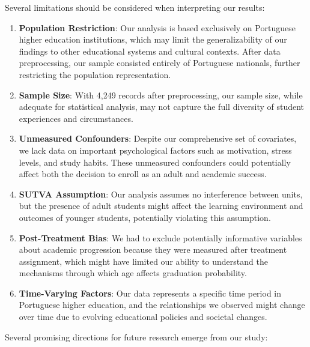 \documentclass{article}
\begin{document}
Several limitations should be considered when interpreting our results:

\begin{enumerate}
    \item \textbf{Population Restriction}: Our analysis is based exclusively on Portuguese higher education institutions, which may limit the generalizability of our findings to other educational systems and cultural contexts. After data preprocessing, our sample consisted entirely of Portuguese nationals, further restricting the population representation.

    \item \textbf{Sample Size}: With 4,249 records after preprocessing, our sample size, while adequate for statistical analysis, may not capture the full diversity of student experiences and circumstances.

    \item \textbf{Unmeasured Confounders}: Despite our comprehensive set of covariates, we lack data on important psychological factors such as motivation, stress levels, and study habits. These unmeasured confounders could potentially affect both the decision to enroll as an adult and academic success.

    \item \textbf{SUTVA Assumption}: Our analysis assumes no interference between units, but the presence of adult students might affect the learning environment and outcomes of younger students, potentially violating this assumption.

    \item \textbf{Post-Treatment Bias}: We had to exclude potentially informative variables about academic progression because they were measured after treatment assignment, which might have limited our ability to understand the mechanisms through which age affects graduation probability.

    \item \textbf{Time-Varying Factors}: Our data represents a specific time period in Portuguese higher education, and the relationships we observed might change over time due to evolving educational policies and societal changes.
\end{enumerate}

Several promising directions for future research emerge from our study:
\end{document}
